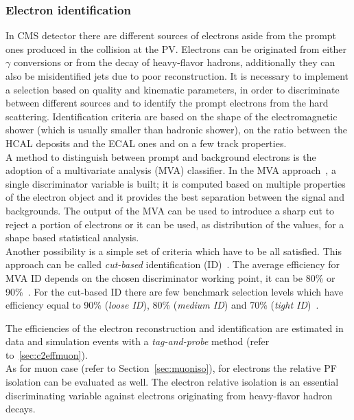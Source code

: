 \subsubsection{Electron identification}\label{sec:c2keleid}
In CMS detector there are different sources of electrons aside from the
prompt ones produced in the collision at the PV. Electrons can be
originated from either $\gamma$ conversions or from the decay of heavy-flavor
hadrons, additionally they can also be misidentified jets due to poor
reconstruction. It is necessary to implement a selection based on quality and
kinematic parameters,  in order to discriminate between different 
sources and to identify the
prompt electrons from the hard scattering.
Identification criteria are based on the shape of the electromagnetic shower
(which is usually smaller than hadronic shower), on the ratio between the
HCAL deposits and the ECAL ones and on a few track properties.\\
A method to distinguish between prompt and background
electrons is the adoption of a multivariate
analysis (MVA) classifier. In the MVA approach~\cite{mvatwiki}, a
single discriminator variable is built; it is computed based on
multiple properties of the electron object and it provides the best
separation between the signal and backgrounds. The output of the MVA
can be used to introduce a sharp cut to reject a portion of electrons
or it can be used, as distribution of the values, for a shape based
statistical analysis.\\
Another possibility is a simple set of criteria which have to be
all satisfied. This approach can be called \emph{cut-based}
identification (ID)~\cite{cutbasedtwiki}. The average efficiency for MVA
ID depends on the chosen discriminator working point, it can be 80\% or
90\%~\cite{mvatwiki}. For the cut-based ID there are few benchmark selection levels
which have efficiency equal to 90\% (\emph{loose ID}), 80\% (\emph{medium
  ID}) and 70\% (\emph{tight ID})~\cite{cutbasedtwiki}.

The efficiencies of the electron reconstruction and identification are
estimated in data and simulation events with a \emph{tag-and-probe}
method (refer to~\ref{sec:c2effmuon}).\\

As for muon case (refer to Section~\ref{sec:muoniso}), for electrons
the relative PF isolation can be evaluated as well. The electron
relative isolation is an essential discriminating variable against 
electrons originating from heavy-flavor hadron decays.


